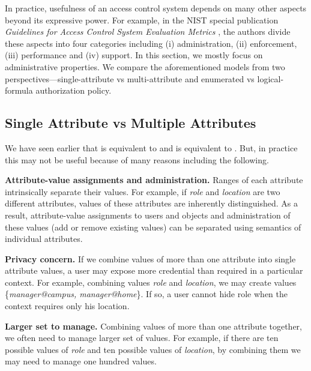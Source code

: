 \newcommand{\office}{\text{office}}
\label{sec:beyond}
In practice, usefulness of an access control system depends on many other aspects beyond its expressive power. For example, in the NIST special publication \textit{Guidelines  for Access Control System Evaluation Metrics} \cite{access-control-evaluation}, the authors divide these aspects into four categories including (i) administration, (ii) enforcement, (iii) performance and (iv) support. In this section, we mostly focus on administrative properties. We compare the aforementioned models from two perspectives---single-attribute vs multi-attribute and enumerated vs logical-formula authorization policy.

\subsection{Single Attribute vs Multiple Attributes}

We have seen earlier that \EPOneOneModels{} is equivalent to \EPMNModel{} and \LPOneOne{} is equivalent to \LPMN{}. But, in practice this may not be useful because of many reasons including the following.

\textbf{Attribute-value assignments and administration.} Ranges of each attribute intrinsically separate their values. For example, if \textit{role} and \textit{location} are two different attributes, values of these attributes are inherently distinguished. As a result, attribute-value assignments to users and objects and administration of these values (add or remove existing values) can be separated using semantics of individual attributes.

\textbf{Privacy concern.} If we combine values of  more than one attribute into single attribute values, a user may expose more credential than required in a particular context.  For example, combining values \textit{role} and \textit{location}, we may create values \{\textit{manager@campus, manager@home}\}. If so, a user cannot hide role  when the context requires only his location.



\textbf{Larger set to manage.} Combining values of more than one attribute together, we often need to manage larger set of values. For example, if there are ten possible values of \textit{role} and ten possible values of \textit{location}, by combining them we may need to manage one hundred values.  



